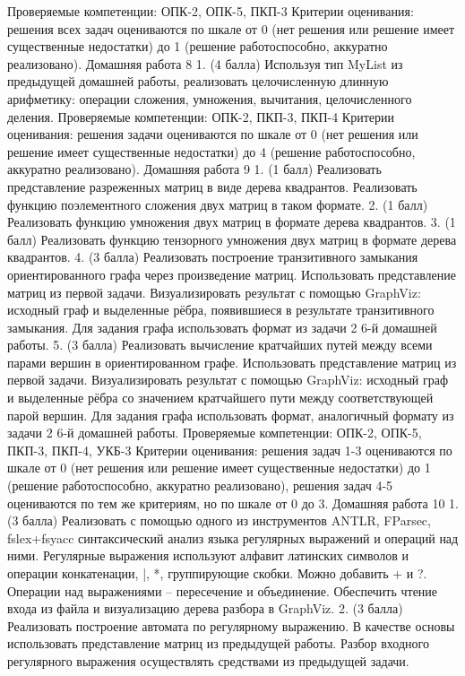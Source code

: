 Проверяемые компетенции: ОПК-2, ОПК-5, ПКП-3
Критерии оценивания: решения всех задач оцениваются по шкале от 0 (нет решения или решение имеет существенные недостатки) до 1 (решение работоспособно, аккуратно реализовано). 
Домашняя работа 8 
    1. (4 балла) Используя тип MyList из предыдущей домашней работы, реализовать целочисленную длинную арифметику: операции сложения, умножения, вычитания, целочисленного деления. 
Проверяемые компетенции: ОПК-2, ПКП-3, ПКП-4
Критерии оценивания: решения задачи оцениваются по шкале от 0 (нет решения или решение имеет существенные недостатки) до 4 (решение работоспособно, аккуратно реализовано). 
Домашняя работа 9
    1. (1 балл) Реализовать представление разреженных матриц в виде дерева квадрантов. Реализовать функцию поэлементного сложения двух матриц в таком формате.
    2. (1 балл) Реализовать функцию умножения двух матриц в формате дерева квадрантов.
    3. (1 балл) Реализовать функцию тензорного умножения двух матриц в формате дерева квадрантов.
    4. (3 балла) Реализовать построение транзитивного замыкания ориентированного графа через произведение матриц. Использовать представление матриц из первой задачи. Визуализировать результат с помощью GraphViz: исходный граф и выделенные рёбра, появившиеся в результате транзитивного замыкания. Для задания графа использовать формат из задачи 2 6-й домашней работы.
    5. (3 балла) Реализовать вычисление кратчайших путей между всеми парами вершин в ориентированном графе. Использовать представление матриц из первой задачи. Визуализировать результат с помощью GraphViz: исходный граф и выделенные рёбра со значением кратчайшего пути между соответствующей парой вершин. Для задания графа использовать формат, аналогичный формату из задачи 2 6-й домашней работы.
Проверяемые компетенции: ОПК-2, ОПК-5, ПКП-3, ПКП-4, УКБ-3
Критерии оценивания: решения задач 1-3 оцениваются по шкале от 0 (нет решения или решение имеет существенные недостатки) до 1 (решение работоспособно, аккуратно реализовано), решения задач 4-5 оцениваются по тем же критериям, но по шкале от 0 до 3.
Домашняя работа 10
    1. (3 балла) Реализовать с помощью одного из инструментов ANTLR, FParsec, fslex+fsyacc синтаксический анализ языка регулярных выражений и операций над ними. Регулярные выражения используют алфавит латинских символов и операции конкатенации, |, *, группирующие скобки. Можно добавить + и ?. Операции над выражениями – пересечение и объединение. Обеспечить чтение входа из файла и визуализацию дерева разбора в GraphViz.
    2. (3 балла) Реализовать построение автомата по регулярному выражению. В качестве основы использовать представление матриц из предыдущей работы. Разбор входного регулярного выражения осуществлять средствами из предыдущей задачи.
